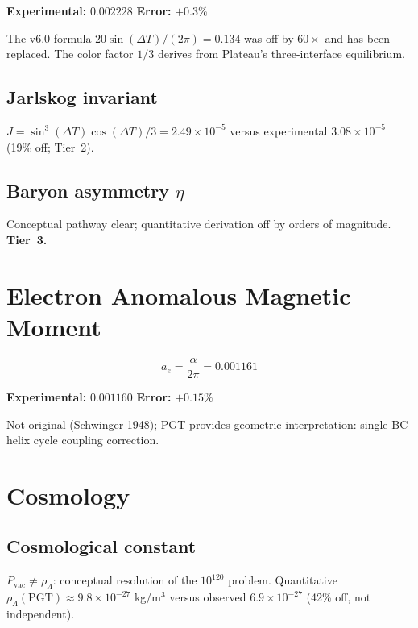 \documentclass[12pt,a4paper,twocolumn]{article}
\newcommand{\Pvac}{P_{\mathrm{vac}}}
\begin{document}
\textbf{Experimental:} $0.002228$ \quad \textbf{Error:} $+0.3\%$

The v6.0 formula $20\sin(\Delta T)/(2\pi) = 0.134$ was off by $60\times$ and has been replaced. The color factor $1/3$ derives from Plateau's three-interface equilibrium.

\subsection{Jarlskog invariant}

$J = \sin^3(\Delta T)\cos(\Delta T)/3 = 2.49\times10^{-5}$ versus experimental $3.08\times10^{-5}$ (19\% off; Tier~2).

\subsection{Baryon asymmetry $\eta$}

Conceptual pathway clear; quantitative derivation off by orders of magnitude. \textbf{Tier~3.}


\section{Electron Anomalous Magnetic Moment}

\begin{equation}
a_e = \frac{\alpha}{2\pi} = 0.001161
\end{equation}

\textbf{Experimental:} $0.001160$ \quad \textbf{Error:} $+0.15\%$

Not original (Schwinger 1948); PGT provides geometric interpretation: single BC-helix cycle coupling correction.


\section{Cosmology}

\subsection{Cosmological constant}

$\Pvac \neq \rho_\Lambda$: conceptual resolution of the $10^{120}$ problem. Quantitative $\rho_\Lambda(\mathrm{PGT}) \approx 9.8\times10^{-27}$ kg/m$^3$ versus observed $6.9\times10^{-27}$ (42\% off, not independent).
\end{document}
